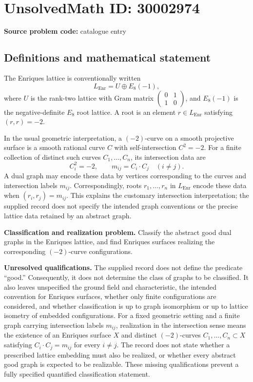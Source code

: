 \documentclass[11pt]{article}
\begin{document}
\section*{UnsolvedMath ID: 30002974}
\textbf{Source problem code:} catalogue entry
\subsection{Definitions and mathematical statement}
The Enriques lattice is conventionally written
\[
L_{\mathrm{Enr}}=U\oplus E_8(-1),
\]
where \(U\) is the rank-two lattice with Gram matrix \(\begin{pmatrix}0&1\\1&0\end{pmatrix}\), and \(E_8(-1)\) is the negative-definite \(E_8\) root lattice. A root is an element \(r\in L_{\mathrm{Enr}}\) satisfying \((r,r)=-2\).

In the usual geometric interpretation, a \((-2)\)-curve on a smooth projective surface is a smooth rational curve \(C\) with self-intersection \(C^2=-2\). For a finite collection of distinct such curves \(C_1,\ldots,C_n\), its intersection data are
\[
C_i^2=-2,\qquad m_{ij}=C_i\cdot C_j\quad(i\ne j).
\]
A dual graph may encode these data by vertices corresponding to the curves and intersection labels \(m_{ij}\). Correspondingly, roots \(r_1,\ldots,r_n\) in \(L_{\mathrm{Enr}}\) encode these data when \((r_i,r_j)=m_{ij}\). This explains the customary intersection interpretation; the supplied record does not specify the intended graph conventions or the precise lattice data retained by an abstract graph.

\textbf{Classification and realization problem.} Classify the abstract good dual graphs in the Enriques lattice, and find Enriques surfaces realizing the corresponding \((-2)\)-curve configurations.

\textbf{Unresolved qualifications.} The supplied record does not define the predicate ``good.'' Consequently, it does not determine the class of graphs to be classified. It also leaves unspecified the ground field and characteristic, the intended convention for Enriques surfaces, whether only finite configurations are considered, and whether classification is up to graph isomorphism or up to lattice isometry of embedded configurations. For a fixed geometric setting and a finite graph carrying intersection labels \(m_{ij}\), realization in the intersection sense means the existence of an Enriques surface \(X\) and distinct \((-2)\)-curves \(C_1,\ldots,C_n\subset X\) satisfying \(C_i\cdot C_j=m_{ij}\) for every \(i\ne j\). The record does not state whether a prescribed lattice embedding must also be realized, or whether every abstract good graph is expected to be realizable. These missing qualifications prevent a fully specified quantified classification statement.
\end{document}

